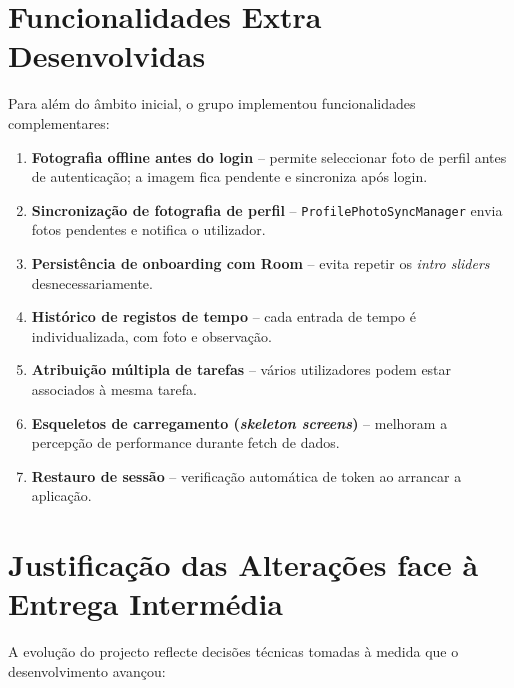 \documentclass[12pt,a4paper]{article}
\begin{document}
\section{Funcionalidades Extra Desenvolvidas}

Para além do âmbito inicial, o grupo implementou funcionalidades complementares:

\begin{enumerate}[leftmargin=*]
    \item \textbf{Fotografia offline antes do login} -- permite seleccionar foto de perfil antes de autenticação; a imagem fica pendente e sincroniza após login.
    \item \textbf{Sincronização de fotografia de perfil} -- \texttt{ProfilePhotoSyncManager} envia fotos pendentes e notifica o utilizador.
    \item \textbf{Persistência de onboarding com Room} -- evita repetir os \textit{intro sliders} desnecessariamente.
    \item \textbf{Histórico de registos de tempo} -- cada entrada de tempo é individualizada, com foto e observação.
    \item \textbf{Atribuição múltipla de tarefas} -- vários utilizadores podem estar associados à mesma tarefa.
    \item \textbf{Esqueletos de carregamento (\textit{skeleton screens})} -- melhoram a percepção de performance durante fetch de dados.
    \item \textbf{Restauro de sessão} -- verificação automática de token ao arrancar a aplicação.
\end{enumerate}

\section{Justificação das Alterações face à Entrega Intermédia}

A evolução do projecto reflecte decisões técnicas tomadas à medida que o desenvolvimento avançou:
\end{document}
